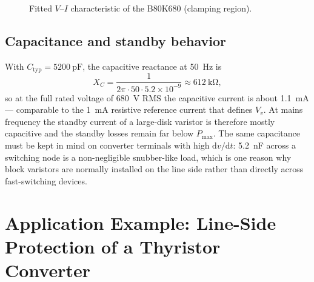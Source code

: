 \documentclass[11pt,a4paper]{article}
\begin{document}
\begin{figure}[htb]
\centering
{}
\caption{Fitted $V$--$I$ characteristic of the B80K680 (clamping region).}
\label{fig:vi}
\end{figure}

\subsection{Capacitance and standby behavior}

With $C_\mathrm{typ} = \SI{5200}{\pico\farad}$, the capacitive reactance at
\SI{50}{\hertz} is
%
\begin{equation}
  X_C = \frac{1}{2\pi \cdot 50 \cdot 5.2\times 10^{-9}}
  \approx \SI{612}{\kilo\ohm},
\end{equation}
%
so at the full rated voltage of \SI{680}{\volt} RMS the capacitive current is
about \SI{1.1}{\milli\ampere} --- comparable to the \SI{1}{\milli\ampere}
resistive reference current that defines $V_v$. At mains frequency the
standby current of a large-disk varistor is therefore mostly capacitive and
the standby losses remain far below $P_\mathrm{max}$. The same capacitance
must be kept in mind on converter terminals with high $\mathrm{d}v/\mathrm{d}t$:
\SI{5.2}{\nano\farad} across a switching node is a non-negligible snubber-like
load, which is one reason why block varistors are normally installed on the
line side rather than directly across fast-switching devices.

\section{Application Example: Line-Side Protection of a Thyristor Converter}
\end{document}
